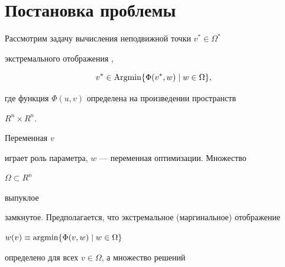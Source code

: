 \date{}







\pagestyle{plain} %













\maketitle













\section{Постановка проблемы}





Рассмотрим задачу вычисления неподвижной точки $v^*\in\Omega^*$


экстремального отображения \cite{A1}, \cite{A2}


\begin{equation}


v^*\in\Argmin\{\Phi(v^*,w)\mid w\in\Omega\},


\end{equation}


где функция $\Phi(u,v)$ определена на произведении пространств


$R^n\times R^n$.


Переменная $v$


играет роль параметра, $w$ --- переменная оптимизации. Множество


$\Omega\subset R^n$


выпуклое


замкнутое. Предполагается, что экстремальное (маргинальное) отображение


$w(v)\equiv\operatorname{argmin}\{\Phi(v,w)\mid w\in\Omega\}$


определено для всех $v\in\Omega$, а множество решений


